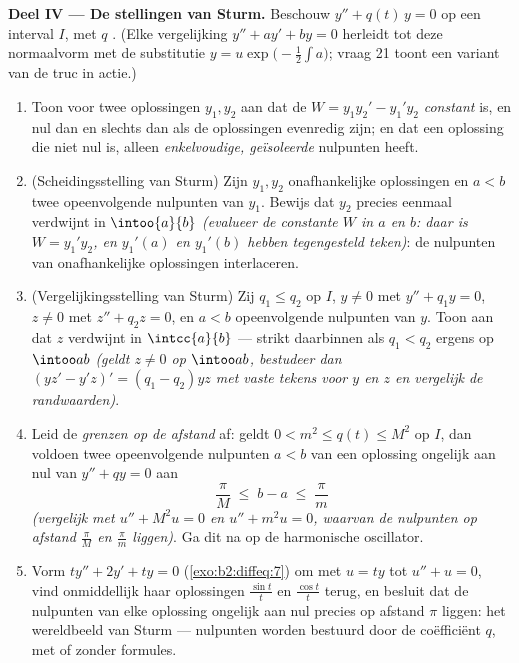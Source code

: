 \begin{problem}
\medskip
\noindent\textbf{Deel IV --- De stellingen van Sturm.} Beschouw
$y'' + q(t)\,y = 0$ op een interval $I$, met $q$ . (Elke
vergelijking $y'' + ay' + by = 0$ herleidt tot deze normaalvorm met
de substitutie $y = u\exp\bigl(-\frac12\int a\bigr)$; vraag 21
toont een variant van de truc in actie.)
\begin{enumerate}[resume]
  \item Toon voor twee oplossingen $y_1, y_2$ aan dat de 
        $W = y_1y_2' - y_1'y_2$ \emph{constant} is, en nul dan en
        slechts dan als de oplossingen evenredig zijn; en dat een
        oplossing die niet nul is, alleen \emph{enkelvoudige,
        geïsoleerde} nulpunten heeft.
  \item (Scheidingsstelling van Sturm) Zijn $y_1, y_2$
        onafhankelijke oplossingen en $a < b$ twee opeenvolgende
        nulpunten van $y_1$. Bewijs dat $y_2$ precies eenmaal
        verdwijnt in $\intoo{a}{b}$ \emph{(evalueer de constante
        $W$ in $a$ en $b$: daar is $W = y_1'y_2$, en $y_1'(a)$ en
        $y_1'(b)$ hebben tegengesteld teken)}: de nulpunten van
        onafhankelijke oplossingen interlaceren.
  \item (Vergelijkingsstelling van Sturm) Zij $q_1 \leq q_2$ op
        $I$, $y \neq 0$ met $y'' + q_1y = 0$, $z \neq 0$ met $z'' +
        q_2z = 0$, en $a < b$ opeenvolgende nulpunten van $y$. Toon
        aan dat $z$ verdwijnt in $\intcc{a}{b}$ --- strikt
        daarbinnen als $q_1 < q_2$ ergens op $\intoo ab$
        \emph{(geldt $z \neq 0$ op $\intoo ab$, bestudeer dan $(yz'
        - y'z)' = (q_1 - q_2)yz$ met vaste tekens voor $y$ en $z$
        en vergelijk de randwaarden)}.
  \item Leid de \emph{grenzen op de afstand} af: geldt $0 < m^2
        \leq q(t) \leq M^2$ op $I$, dan voldoen twee opeenvolgende
        nulpunten $a < b$ van een oplossing ongelijk aan nul van
        $y'' + qy = 0$ aan
        \[
        \frac{\pi}{M} \;\leq\; b - a \;\leq\; \frac{\pi}{m}
        \]
        \emph{(vergelijk met $u'' + M^2u = 0$ en $u'' + m^2u = 0$,
        waarvan de nulpunten op afstand $\frac\pi M$ en $\frac\pi
        m$ liggen)}. Ga dit na op de harmonische oscillator.
  \item Vorm $ty'' + 2y' + ty = 0$ (\cref{exo:b2:diffeq:7}) om met
        $u = ty$ tot $u'' + u = 0$, vind onmiddellijk haar
        oplossingen $\frac{\sin t}t$ en $\frac{\cos t}{t}$ terug, en
        besluit dat de nulpunten van elke oplossing ongelijk aan nul
        precies op afstand $\pi$ liggen: het wereldbeeld van Sturm
        --- nulpunten worden bestuurd door de coëfficiënt $q$, met
        of zonder formules.
\end{enumerate}


\end{problem}
